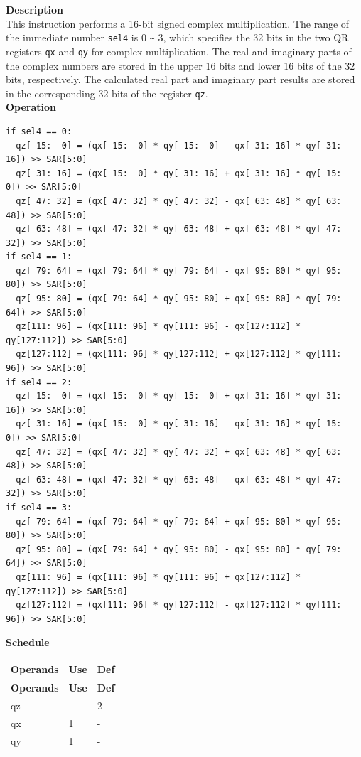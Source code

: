 \textbf{Description}\\

This instruction performs a 16-bit signed complex multiplication. The range of the immediate number \lstinline{sel4} is 0 \verb+~+ 3, which specifies the 32 bits in the two QR registers \lstinline{qx} and \lstinline{qy} for complex multiplication. The real and imaginary parts of the complex numbers are stored in the upper 16 bits and lower 16 bits of the 32 bits, respectively. The calculated real part and imaginary part results are stored in the corresponding 32 bits of the register \lstinline{qz}.\\

\textbf{Operation}
\begin{lstlisting}
if sel4 == 0:
  qz[ 15:  0] = (qx[ 15:  0] * qy[ 15:  0] - qx[ 31: 16] * qy[ 31: 16]) >> SAR[5:0]
  qz[ 31: 16] = (qx[ 15:  0] * qy[ 31: 16] + qx[ 31: 16] * qy[ 15:  0]) >> SAR[5:0]
  qz[ 47: 32] = (qx[ 47: 32] * qy[ 47: 32] - qx[ 63: 48] * qy[ 63: 48]) >> SAR[5:0]
  qz[ 63: 48] = (qx[ 47: 32] * qy[ 63: 48] + qx[ 63: 48] * qy[ 47: 32]) >> SAR[5:0]
if sel4 == 1:
  qz[ 79: 64] = (qx[ 79: 64] * qy[ 79: 64] - qx[ 95: 80] * qy[ 95: 80]) >> SAR[5:0]
  qz[ 95: 80] = (qx[ 79: 64] * qy[ 95: 80] + qx[ 95: 80] * qy[ 79: 64]) >> SAR[5:0]
  qz[111: 96] = (qx[111: 96] * qy[111: 96] - qx[127:112] * qy[127:112]) >> SAR[5:0]
  qz[127:112] = (qx[111: 96] * qy[127:112] + qx[127:112] * qy[111: 96]) >> SAR[5:0]
if sel4 == 2:
  qz[ 15:  0] = (qx[ 15:  0] * qy[ 15:  0] + qx[ 31: 16] * qy[ 31: 16]) >> SAR[5:0]
  qz[ 31: 16] = (qx[ 15:  0] * qy[ 31: 16] - qx[ 31: 16] * qy[ 15:  0]) >> SAR[5:0]
  qz[ 47: 32] = (qx[ 47: 32] * qy[ 47: 32] + qx[ 63: 48] * qy[ 63: 48]) >> SAR[5:0]
  qz[ 63: 48] = (qx[ 47: 32] * qy[ 63: 48] - qx[ 63: 48] * qy[ 47: 32]) >> SAR[5:0]
if sel4 == 3:
  qz[ 79: 64] = (qx[ 79: 64] * qy[ 79: 64] + qx[ 95: 80] * qy[ 95: 80]) >> SAR[5:0]
  qz[ 95: 80] = (qx[ 79: 64] * qy[ 95: 80] - qx[ 95: 80] * qy[ 79: 64]) >> SAR[5:0]
  qz[111: 96] = (qx[111: 96] * qy[111: 96] + qx[127:112] * qy[127:112]) >> SAR[5:0]
  qz[127:112] = (qx[111: 96] * qy[127:112] - qx[127:112] * qy[111: 96]) >> SAR[5:0]
\end{lstlisting}

\textbf{Schedule}\\
\begin{longtable}[c]{|l|l|l|}
    \hline
    \rowcolor{lightgray}
    \textbf{Operands} & \textbf{Use} & \textbf{Def} \\\hline
    \endfirsthead
    \hline
    \rowcolor{lightgray}
     \textbf{Operands} & \textbf{Use} & \textbf{Def} \\\hline
    \endhead
    \hline
    \endfoot


    qz & - & 2 \\\hline
     qx & 1 & - \\\hline
     qy & 1 & -


\end{longtable}

